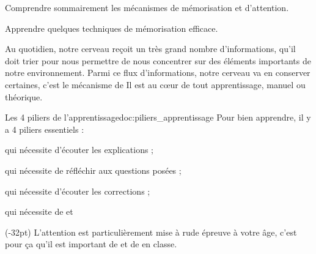 \teteSndAP
\vspace*{-32pt}

\begin{objectifs}
  \item Comprendre sommairement les mécanismes de mémorisation et d'attention.
  \item Apprendre quelques techniques de mémorisation efficace.
\end{objectifs}

\begin{contexte}
  Au quotidien, notre cerveau reçoit un très grand nombre d'informations, qu'il doit trier pour nous permettre de nous concentrer sur des éléments importants de notre environnement.
  Parmi ce flux d'informations, notre cerveau va en conserver certaines, c'est le mécanisme de  Il est au cœur de tout apprentissage, manuel ou théorique.

\end{contexte}

\begin{doc}{Les 4 piliers de l'apprentissage}{doc:piliers_apprentissage}
  Pour bien apprendre, il y a 4 piliers essentiels : 
  \begin{listePoints}
    \item {} qui nécessite d'écouter les explications ;
    \item {} qui nécessite de réfléchir aux questions posées ;
    \item {} qui nécessite d'écouter les corrections ;
    \item {} qui nécessite de  et 
  \end{listePoints}

  (-32pt)
  L'attention est particulièrement mise à rude épreuve à votre âge, c'est pour ça qu'il est important de  et de  en classe.
\end{doc}

